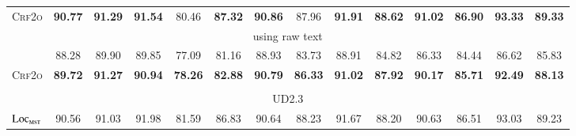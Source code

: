 \begin{table*}[tb]
\begin{tabularx}{\textwidth}{lccccccccccccc}
    \textsc{Crf2o}                    & \textbf{90.77} & \textbf{91.29} & \textbf{91.54}\rlap{$^\dagger$}  & 80.46                           & \textbf{87.32}\rlap{$^\dagger$} & \textbf{90.86}\rlap{$^\dagger$}  & 87.96                           & \textbf{91.91}\rlap{$^\ddagger$} & \textbf{88.62}\rlap{$^\ddagger$} & \textbf{91.02}\rlap{$^\dagger$} & \textbf{86.90}\rlap{$^\ddagger$} & \textbf{93.33}\rlap{$^\ddagger$} & \textbf{89.33}\rlap{$^\ddagger$} \\[1pt]
    \multicolumn{14}{c}{using raw text}                                                                                                                                                                                                                                                                                                                                                                                                                              \\[1pt]
    \citet{ji-etal-2019-graph}        & 88.28          & 89.90          & 89.85                            & 77.09                           & 81.16                           & 88.93                            & 83.73                           & 88.91                            & 84.82                            & 86.33                           & 84.44                            & 86.62                            & 85.83                            \\
    \textsc{Crf2o}                    & \textbf{89.72} & \textbf{91.27} & \textbf{90.94}                   & \textbf{78.26}                  & \textbf{82.88}                  & \textbf{90.79}                   & \textbf{86.33}                  & \textbf{91.02}                   & \textbf{87.92}                   & \textbf{90.17}                  & \textbf{85.71}                   & \textbf{92.49}                   & \textbf{88.13}                   \\
    \hline
    \\[-15pt]
    \multicolumn{14}{c}{UD2.3}                                                                                                                                                                                                                                                                                                                                                                                                                                       \\[1pt]
    $\textsc{Loc}_{\textsc{mst}}$     & 90.56          & 91.03          & 91.98                            & 81.59                           & 86.83                           & 90.64                            & 88.23                           & 91.67                            & 88.20                            & 90.63                           & 86.51                            & 93.03                            & 89.23                            \\

\end{tabularx}
\end{table*}
